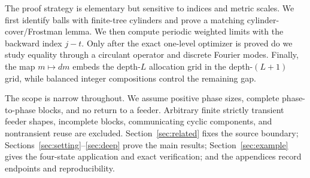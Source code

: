 The proof strategy is elementary but sensitive to indices and metric scales.
We first identify balls with finite-tree cylinders and prove a matching
cylinder-cover/Frostman lemma.  We then compute periodic weighted limits with
the backward index $j-t$.  Only after the exact one-level optimizer is proved
do we study equality through a circulant operator and discrete Fourier
modes.  Finally, the map $m\mapsto dm$ embeds the depth-$L$ allocation grid in
the depth-$(L+1)$ grid, while balanced integer compositions control the
remaining gap.

The scope is narrow throughout.  We assume positive phase sizes, complete
phase-to-phase blocks, and no return to a feeder.  Arbitrary finite strictly
transient feeder shapes, incomplete blocks, communicating cyclic components,
and nontransient reuse are excluded.  Section~\ref{sec:related} fixes the
source boundary; Sections~\ref{sec:setting}--\ref{sec:deep} prove the main
results; Section~\ref{sec:example} gives the four-state application and exact
verification; and the appendices record endpoints and reproducibility.
